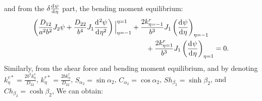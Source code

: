 \documentclass[preprint,12pt]{elsarticle}
\newcommand{\id}{\mathrm{d}\mkern1mu}
\begin{document}
%
and from the $\delta \frac{\id \psi}{\id \eta}$ part, the bending moment equilibrium:
%
\begin{equation}\label{eq:inertial_forcey2}	
 \begin{split}
 	\left( \frac{D_{12}}{a^2b^2} J_2 \psi + \frac{D_{22}}{b^4} J_1 \frac{\id^2 \psi}{\id \eta^2} \right) 
 	\Big|^{\eta=1}_{\eta=-1} 
 	&+ \frac{2k^r_{\eta=-1}}{b^3} J_1 \left( \frac{\id \psi}{\id \eta} \right)_{\eta=-1} \\
 	&\qquad+ \frac{2k^r_{\eta=1}}{b^3} J_1 \left( \frac{\id \psi}{\id \eta} \right)_{\eta=1}=0.
 \end{split}
\end{equation}
%
Similarly, from the shear force and bending moment equilibrium, and by denoting 
$k^{v*}_{\eta} = \frac{2b^3 k^v_{\eta}}{D_{22}} $, 
$ k^{r*}_{\eta} = \frac{2b k^r_{\eta}}{D_{22}} $, 
$S_{\alpha_2}=\sin\alpha_2  $, 
$ C_{\alpha_2}=\cos\alpha_2  $, 
$ Sh_{\beta_2}=\sinh\beta_2$, and 
$Ch_{\beta_2}= \cosh\beta_2$, 
We can obtain:
%
\end{document}
